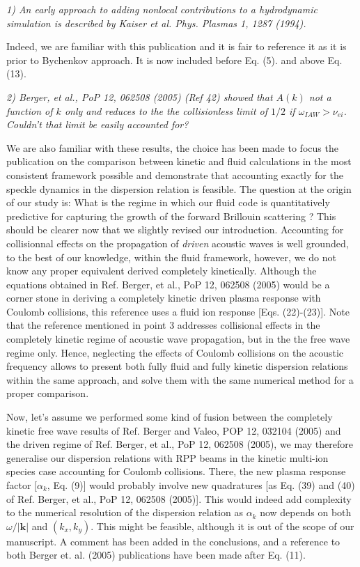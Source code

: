\documentclass{article}
\begin{document}
\textit{
1)   An early approach to adding nonlocal contributions to a hydrodynamic simulation is
described by Kaiser et al. Phys. Plasmas 1, 1287 (1994).}

Indeed, we are familiar with this publication and it is fair to reference it as it is prior to Bychenkov approach. It is now included before Eq. (5). and above Eq. (13).

\textit{
2)   Berger, et al., PoP 12, 062508 (2005) (Ref 42) showed that $A(k)$ not a function of $k$
only and reduces to the the collisionless limit of $1/2$ if $\omega_{IAW} > \nu_{ei}$. Couldn’t that limit
be easily accounted for?
}

We are also familiar with these results, the choice has been made to focus the publication on the comparison between kinetic and fluid calculations in the most consistent framework possible and demonstrate that accounting exactly for the speckle dynamics in the dispersion relation is feasible. The question at the origin of our study is: What is the  regime  in which our fluid code is quantitatively predictive for capturing the growth of the forward Brillouin scattering ? This should be clearer now that we slightly revised our introduction.
Accounting for collisionnal effects on the propagation of \emph{driven} acoustic waves is well grounded, to the best of our knowledge, within  the fluid framework, however, we do not know any proper equivalent derived completely kinetically. Although the equations obtained in  Ref. Berger, et al., PoP 12, 062508 (2005) would be a corner stone in deriving a completely kinetic driven plasma response with Coulomb collisions,  this reference uses a fluid ion response [Eqs. (22)-(23)].
Note that the reference  mentioned in point 3 addresses  collisional effects in the completely kinetic regime of acoustic wave propagation, but in the the free wave regime only.
Hence, neglecting the effects of Coulomb collisions on the acoustic frequency allows to present both fully fluid and fully kinetic dispersion relations within the same approach, and solve them with the same numerical method for a proper comparison.

Now, let's  assume we performed some kind of fusion between the completely kinetic free wave results of Ref. Berger and Valeo, POP 12, 032104 (2005) and the driven regime of  Ref. Berger, et al., PoP 12, 062508 (2005), we may therefore generalise our dispersion relations with RPP beams in the kinetic multi-ion species case accounting for Coulomb collisions. There, the new plasma response factor [$\alpha_k$, Eq. (9)]  would probably involve new quadratures [as Eq. (39) and  (40) of Ref. Berger, et al., PoP 12, 062508 (2005)]. This would indeed add complexity to the numerical resolution of the dispersion relation as $\alpha_k$ now depends on both $\omega/\vert \mathbf{k} \vert $ and $(k_x, k_y)$. This might be feasible,  although it is out of the scope of our manuscript. A comment has been added in the conclusions, and a reference to both Berger et. al. (2005) publications have been made after Eq. (11).
\end{document}
